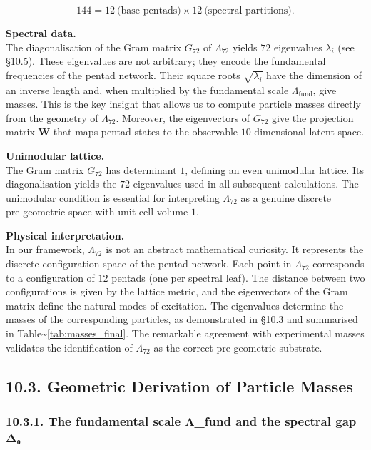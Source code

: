 \documentclass[11pt]{article}
\begin{document}
\[
144 = 12\ \text{(base pentads)} \times 12\ \text{(spectral partitions)}.
\]

\textbf{Spectral data.}\\
The diagonalisation of the Gram matrix \(G_{72}\) of \(\Lambda_{72}\)
yields \(72\) eigenvalues \(\lambda_i\) (see §10.5). These eigenvalues
are not arbitrary; they encode the fundamental frequencies of the pentad
network. Their square roots \(\sqrt{\lambda_i}\) have the dimension of
an inverse length and, when multiplied by the fundamental scale
\(\Lambda_{\text{fund}}\), give masses. This is the key insight that
allows us to compute particle masses directly from the geometry of
\(\Lambda_{72}\). Moreover, the eigenvectors of \(G_{72}\) give the
projection matrix \(\mathbf{W}\) that maps pentad states to the
observable \(10\)‑dimensional latent space.

\textbf{Unimodular lattice.}\\
The Gram matrix \(G_{72}\) has determinant \(1\), defining an even
unimodular lattice. Its diagonalisation yields the \(72\) eigenvalues
used in all subsequent calculations. The unimodular condition is
essential for interpreting \(\Lambda_{72}\) as a genuine discrete
pre‑geometric space with unit cell volume \(1\).

\textbf{Physical interpretation.}\\
In our framework, \(\Lambda_{72}\) is not an abstract mathematical
curiosity. It represents the discrete configuration space of the pentad
network. Each point in \(\Lambda_{72}\) corresponds to a configuration
of \(12\) pentads (one per spectral leaf). The distance between two
configurations is given by the lattice metric, and the eigenvectors of
the Gram matrix define the natural modes of excitation. The eigenvalues
determine the masses of the corresponding particles, as demonstrated in
§10.3 and summarised in Table\textasciitilde{}\ref{tab:masses_final}.
The remarkable agreement with experimental masses validates the
identification of \(\Lambda_{72}\) as the correct pre‑geometric
substrate.

\hypertarget{geometric-derivation-of-particle-masses}{%
\subsection{10.3. Geometric Derivation of Particle
Masses}\label{geometric-derivation-of-particle-masses}}

\hypertarget{the-fundamental-scale-ux3bb_fund-and-the-spectral-gap-ux3b4ux2080}{%
\subsubsection{10.3.1. The fundamental scale Λ\_fund and the spectral
gap
Δ₀}\label{the-fundamental-scale-ux3bb_fund-and-the-spectral-gap-ux3b4ux2080}}
\end{document}
